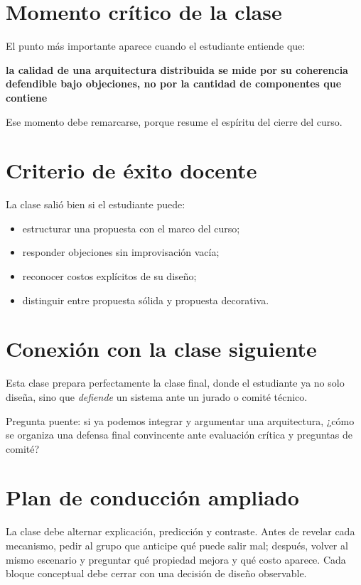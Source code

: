 \documentclass[variant=docente,cover=institutional,mode=screen]{ua-engineering-v6-article}
\begin{document}
\section{Momento crítico de la clase}

El punto más importante aparece cuando el estudiante entiende que:

\begin{center}
\textbf{la calidad de una arquitectura distribuida se mide por su coherencia defendible bajo objeciones, no por la cantidad de componentes que contiene}
\end{center}

Ese momento debe remarcarse, porque resume el espíritu del cierre del curso.

\section{Criterio de éxito docente}

La clase salió bien si el estudiante puede:

\begin{itemize}
\item estructurar una propuesta con el marco del curso;
\item responder objeciones sin improvisación vacía;
\item reconocer costos explícitos de su diseño;
\item distinguir entre propuesta sólida y propuesta decorativa.
\end{itemize}

\section{Conexión con la clase siguiente}

Esta clase prepara perfectamente la clase final, donde el estudiante ya no solo diseña, sino que \emph{defiende} un sistema ante un jurado o comité técnico.

\begin{uakeybox}
Pregunta puente: si ya podemos integrar y argumentar una arquitectura, ¿cómo se organiza una defensa final convincente ante evaluación crítica y preguntas de comité?
\end{uakeybox}


\section{Plan de conducción ampliado}
La clase debe alternar explicación, predicción y contraste. Antes de revelar cada mecanismo, pedir al grupo que anticipe qué puede salir mal; después, volver al mismo escenario y preguntar qué propiedad mejora y qué costo aparece. Cada bloque conceptual debe cerrar con una decisión de diseño observable.
\end{document}
